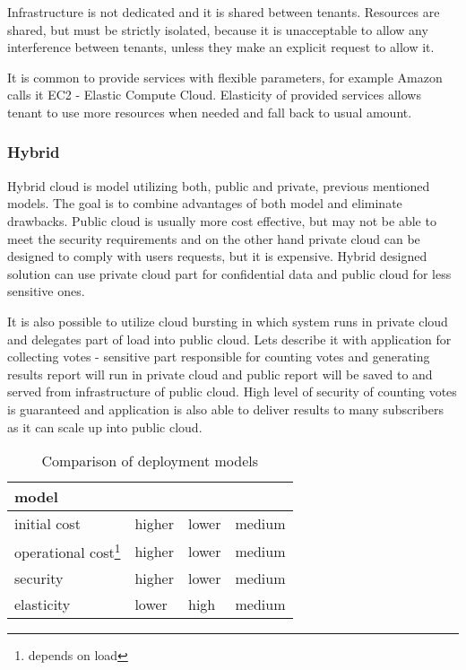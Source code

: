 Infrastructure is not dedicated and it is shared between tenants. Resources are shared, but must be strictly isolated, because it is unacceptable to allow any interference between tenants, unless they make an explicit request to allow it.

It is common to provide services with flexible parameters, for example Amazon calls it EC2 - Elastic Compute Cloud. Elasticity of provided services allows tenant to use more resources when needed and fall back to usual amount. 

\subsubsection{Hybrid}
Hybrid cloud is model utilizing both, public and private, previous mentioned models. The goal is to combine advantages of both model and eliminate drawbacks. Public cloud is usually more cost effective, but may not be able to meet the security requirements and on the other hand private cloud can be designed to comply with users requests, but it is expensive. Hybrid designed solution can use private cloud part for confidential data and public cloud for less sensitive ones. 

It is also possible to utilize cloud bursting in which system runs in private cloud and delegates part of load into public cloud. Lets describe it with application for collecting votes - sensitive part responsible for counting votes and generating results report will run in private cloud and public report will be saved to and served from infrastructure of public cloud. High level of security of counting votes is guaranteed and application is also able to deliver results to many subscribers as it can scale up into public cloud.





\begin{table}[htb]
\begin{center}
	\caption{Comparison of deployment models}
	\label{tab:deployment-models}
	\begin{tabularx}{\textwidth}{|X|X|X|X|}
	\hline
	model & \Th{private} & \Th{public} & \Th{hybrid} \\
	\hline
	initial cost & higher & lower & medium \\
	\hline
	operational cost\footnote{depends on load} & higher & lower & medium \\
	\hline
	security & higher & lower & medium \\
	\hline
	elasticity & lower & high & medium \\
	\hline
	\end{tabularx}
\end{center}
\end{table}


